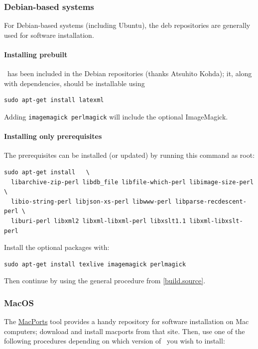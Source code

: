 \documentclass{article}
\begin{document}
\subsubsection{Debian-based systems}\label{install.debian}
For Debian-based systems (including Ubuntu), the deb repositories
are generally used for software installation.

\paragraph{Installing prebuilt}
\LaTeXML\ has been included in the Debian repositories (thanks Atsuhito Kohda);
it, along with dependencies, should be installable using
\begin{lstlisting}[style=shell]
sudo apt-get install latexml
\end{lstlisting}
Adding \texttt{imagemagick perlmagick} will include the optional ImageMagick.

\paragraph{Installing only prerequisites}
The prerequisites can be installed (or updated) by running this command as root: 
\begin{lstlisting}[style=shell]
sudo apt-get install   \
  libarchive-zip-perl libdb_file libfile-which-perl libimage-size-perl \
  libio-string-perl libjson-xs-perl libwww-perl libparse-recdescent-perl \
  liburi-perl libxml2 libxml-libxml-perl libxslt1.1 libxml-libxslt-perl
\end{lstlisting}
Install the optional packages with:
\begin{lstlisting}[style=shell]
sudo apt-get install texlive imagemagick perlmagick 
\end{lstlisting}
Then continue by using the general procedure from \ref{build.source}.


\subsubsection{MacOS}\label{install.macos}\index{macintosh}
The \href{http://www.macports.org}{MacPorts} tool provides a handy
repository for software installation on Mac computers;
download and install macports from that site.
Then, use one of the following procedures depending on which version
of \LaTeXML\ you wish to install:
\end{document}

